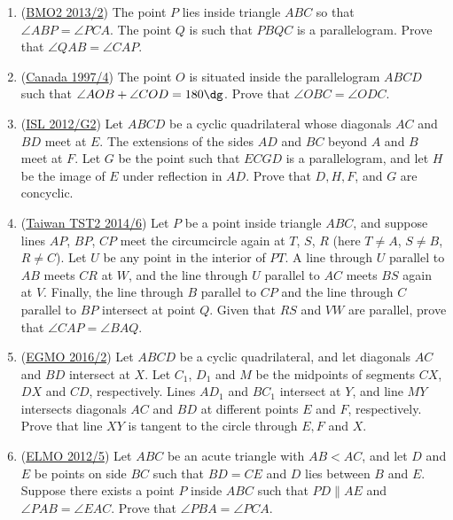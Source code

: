 \documentclass[11pt,paper=letter]{scrartcl}
\begin{document}
\begin{enumerate}
  \item (\href{http://www.aops.com/community/c6h518987}{BMO2 2013/2}) The point $P$ lies inside triangle $ABC$ so that $\angle ABP = \angle PCA$. The point $Q$ is such that $PBQC$ is a parallelogram. Prove that $\angle QAB = \angle CAP$.

  \item (\href{https://aops.com/community/c6h405503}{Canada 1997/4}) The point $O$ is situated inside the parallelogram $ABCD$ such that $\angle AOB + \angle COD = 180\dg$. Prove that $\angle OBC = \angle ODC$. %

  \item (\href{https://aops.com/community/c6h546176}{ISL 2012/G2}) Let $ABCD$ be a cyclic quadrilateral whose diagonals $AC$ and $BD$ meet at $E$. The extensions of the sides $AD$ and $BC$ beyond $A$ and $B$ meet at $F$. Let $G$ be the point such that $ECGD$ is a parallelogram, and let $H$ be the image of $E$ under reflection in $AD$. Prove that $D, H, F$, and $G$ are concyclic.

  \item (\href{http://www.aops.com/community/c6h598540}{Taiwan TST2 2014/6}) Let $P$ be a point inside triangle $ABC$, and suppose lines $AP$, $BP$, $CP$ meet the circumcircle again at $T$, $S$, $R$ (here $T \neq A$, $S \neq B$, $R \neq C$). Let $U$ be any point in the interior of $PT$. A line through $U$ parallel to $AB$ meets $CR$ at $W$, and the line through $U$ parallel to $AC$ meets $BS$ again at $V$. Finally, the line through $B$ parallel to $CP$ and the line through $C$ parallel to $BP$ intersect at point $Q$. Given that $RS$ and $VW$ are parallel, prove that $\angle CAP = \angle BAQ$.

  \item (\href{https://aops.com/community/c6h1226672}{EGMO 2016/2}) Let $ABCD$ be a cyclic quadrilateral, and let diagonals $AC$ and $BD$ intersect at $X$. Let $C_1$, $D_1$ and $M$ be the midpoints of segments $CX$, $DX$ and $CD$, respectively. Lines $AD_1$ and $BC_1$ intersect at $Y$, and line $MY$ intersects diagonals $AC$ and $BD$ at different points $E$ and $F$, respectively. Prove that line $XY$ is tangent to the circle through $E,F$ and $X$.

  \item (\href{https://aops.com/community/c6h486936}{ELMO 2012/5}) Let $ABC$ be an acute triangle with $AB<AC$, and let $D$ and $E$ be points on side $BC$ such that $BD=CE$ and $D$ lies between $B$ and $E$. Suppose there exists a point $P$ inside $ABC$ such that $PD\parallel AE$ and $\angle PAB=\angle EAC$. Prove that $\angle PBA=\angle PCA$.
\end{enumerate}
\end{document}
